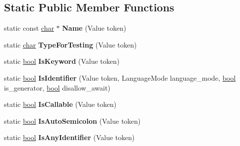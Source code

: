 \subsection*{Static Public Member Functions}
\begin{DoxyCompactItemize}
\item 
\mbox{\label{classv8_1_1internal_1_1Token_a84e4dfd6e827440e1f6fe907175f361b}} 
static const \mbox{\hyperlink{classchar}{char}} $\ast$ {\bfseries Name} (Value token)
\item 
\mbox{\label{classv8_1_1internal_1_1Token_a6f4448ee5f969fd907523cfeadc70964}} 
static \mbox{\hyperlink{classchar}{char}} {\bfseries Type\+For\+Testing} (Value token)
\item 
\mbox{\label{classv8_1_1internal_1_1Token_aeb5150121546a6f85cf2691d6fcf6f2b}} 
static \mbox{\hyperlink{classbool}{bool}} {\bfseries Is\+Keyword} (Value token)
\item 
\mbox{\label{classv8_1_1internal_1_1Token_ada63a32ddd08219cb0afcb850441dad3}} 
static \mbox{\hyperlink{classbool}{bool}} {\bfseries Is\+Identifier} (Value token, Language\+Mode language\+\_\+mode, \mbox{\hyperlink{classbool}{bool}} is\+\_\+generator, \mbox{\hyperlink{classbool}{bool}} disallow\+\_\+await)
\item 
\mbox{\label{classv8_1_1internal_1_1Token_a9611f1c646c5ebb2691e2ae150b7c371}} 
static \mbox{\hyperlink{classbool}{bool}} {\bfseries Is\+Callable} (Value token)
\item 
\mbox{\label{classv8_1_1internal_1_1Token_a2a3c31e12574a3d7fb44719250f46b48}} 
static \mbox{\hyperlink{classbool}{bool}} {\bfseries Is\+Auto\+Semicolon} (Value token)
\item 
\mbox{\label{classv8_1_1internal_1_1Token_a55c4e650fdce6b5c98fdfed13e174c0d}} 
static \mbox{\hyperlink{classbool}{bool}} {\bfseries Is\+Any\+Identifier} (Value token)
\item 
\mbox{\label{classv8_1_1internal_1_1Token_ac93c7231b6162cedc2f7b432bcd71448}} 

\end{DoxyCompactItemize}
